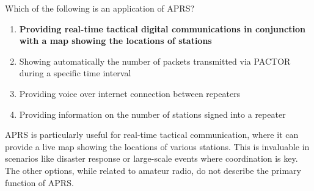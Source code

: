 \begin{tcolorbox}[colback=gray!10!white,colframe=black!75!black,title={T8D05}]
    Which of the following is an application of APRS?
    \begin{enumerate}[label=\Alph*),noitemsep]
        \item \textbf{Providing real-time tactical digital communications in conjunction with a map showing the locations of stations}
        \item Showing automatically the number of packets transmitted via PACTOR during a specific time interval
        \item Providing voice over internet connection between repeaters
        \item Providing information on the number of stations signed into a repeater
    \end{enumerate}
\end{tcolorbox}

APRS is particularly useful for real-time tactical communication, where it can provide a live map showing the locations of various stations. This is invaluable in scenarios like disaster response or large-scale events where coordination is key. The other options, while related to amateur radio, do not describe the primary function of APRS.

